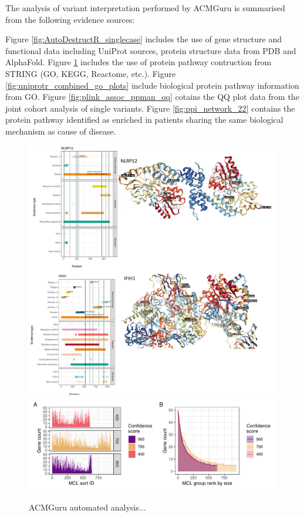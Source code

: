 \documentclass{article}
\begin{document}
The analysis of variant interpretation performed by ACMGuru is summarised from the following evidence sources:

{\color{kispired} Figure} \ref{fig:AutoDestructR_singlecase} includes the use of gene structure and functional data including UniProt sources, protein structure data from PDB and AlphaFold.
{\color{kispired} Figure} \ref{fig:ppi_line_whole_genome_v1_compared} includes the use of protein pathway contruction from STRING (GO, KEGG, Reactome, etc.).
{\color{kispired} Figure} \ref{fig:uniprotr_combined_go_plots} include biological protein pathway information from GO.
{\color{kispired} Figure} \ref{fig:plink_assoc_ppman_qq} cotains the QQ plot data from the joint cohort analysis of single variants. 
{\color{kispired} Figure} \ref{fig:ppi_network_22} contains the protein pathway identified as enriched in patients sharing the same biological mechanism as cause of disease. 


\begin{figure}[h] \hspace*{0cm} 
\begin{center}
    \includegraphics[scale=0.5]{../images/acmguru/AutoDestructR_singlecase}
    \includegraphics[scale=0.5]{../images/acmguru/ppi_line_whole_genome_v1_compared}
    		\caption{ACMGuru automated analysis...}
    		\label{fig:AutoDestructR_singlecase}
		\label{fig:ppi_line_whole_genome_v1_compared}
\end{center}
\end{figure}
\end{document}
